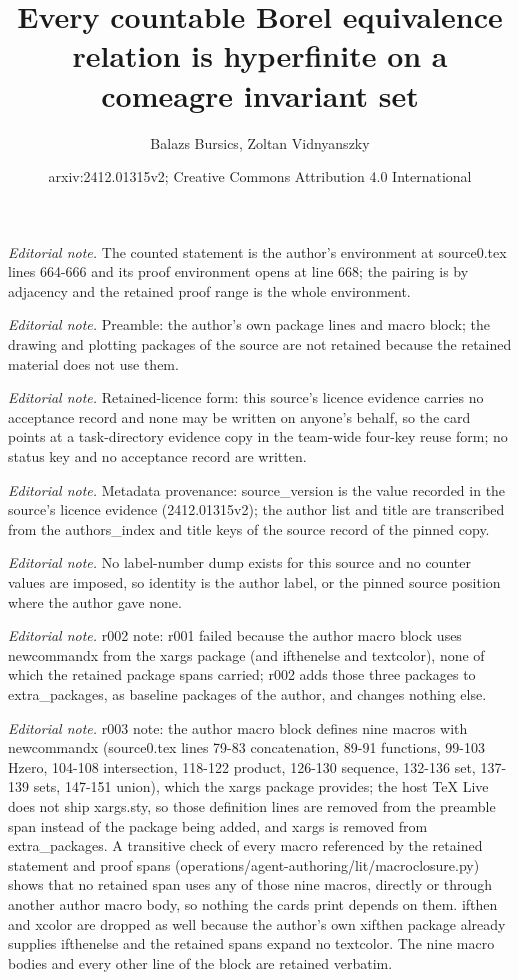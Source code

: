 \documentclass[10pt,a4paper]{article}
\title{Every countable Borel equivalence relation is hyperfinite on a comeagre invariant set}
\author{Balazs Bursics, Zoltan Vidnyanszky}
\date{arxiv:2412.01315v2; Creative Commons Attribution 4.0 International}
\theoremstyle{definition}
\numberwithin{equation}{section}
\begin{document}
\maketitle
\noindent\textit{Editorial note.} The counted statement is the author's environment at source0.tex lines 664-666 and its proof environment opens at line 668; the pairing is by adjacency and the retained proof range is the whole environment.\par\medskip
\noindent\textit{Editorial note.} Preamble: the author's own package lines and macro block; the drawing and plotting packages of the source are not retained because the retained material does not use them.\par\medskip
\noindent\textit{Editorial note.} Retained-licence form: this source's licence evidence carries no acceptance record and none may be written on anyone's behalf, so the card points at a task-directory evidence copy in the team-wide four-key reuse form; no status key and no acceptance record are written.\par\medskip
\noindent\textit{Editorial note.} Metadata provenance: source\_version is the value recorded in the source's licence evidence (2412.01315v2); the author list and title are transcribed from the authors\_index and title keys of the source record of the pinned copy.\par\medskip
\noindent\textit{Editorial note.} No label-number dump exists for this source and no counter values are imposed, so identity is the author label, or the pinned source position where the author gave none.\par\medskip
\noindent\textit{Editorial note.} r002 note: r001 failed because the author macro block uses newcommandx from the xargs package (and ifthenelse and textcolor), none of which the retained package spans carried; r002 adds those three packages to extra\_packages, as baseline packages of the author, and changes nothing else.\par\medskip
\noindent\textit{Editorial note.} r003 note: the author macro block defines nine macros with newcommandx (source0.tex lines 79-83 concatenation, 89-91 functions, 99-103 Hzero, 104-108 intersection, 118-122 product, 126-130 sequence, 132-136 set, 137-139 sets, 147-151 union), which the xargs package provides; the host TeX Live does not ship xargs.sty, so those definition lines are removed from the preamble span instead of the package being added, and xargs is removed from extra\_packages. A transitive check of every macro referenced by the retained statement and proof spans (operations/agent-authoring/lit/macroclosure.py) shows that no retained span uses any of those nine macros, directly or through another author macro body, so nothing the cards print depends on them. ifthen and xcolor are dropped as well because the author's own xifthen package already supplies ifthenelse and the retained spans expand no textcolor. The nine macro bodies and every other line of the block are retained verbatim.\par\medskip
\end{document}
